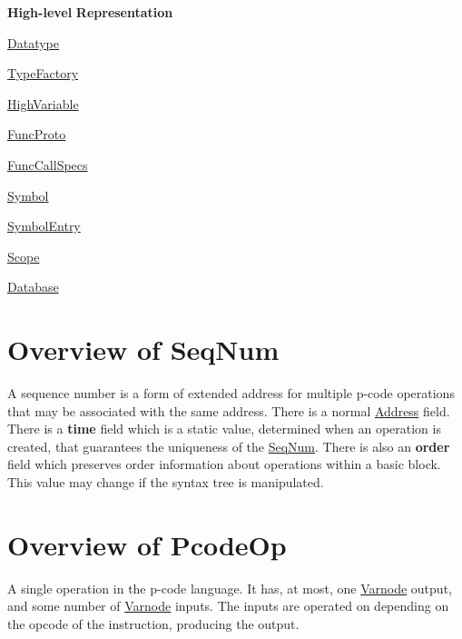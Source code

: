 {\bfseries{High-\/level}} {\bfseries{Representation}} 
\begin{DoxyItemize}
\item \mbox{\hyperlink{coreclasses_classdatatype}{Datatype}}
\item \mbox{\hyperlink{coreclasses_classtypefactory}{Type\+Factory}}
\item \mbox{\hyperlink{coreclasses_classhighvariable}{High\+Variable}}
\item \mbox{\hyperlink{coreclasses_classfuncproto}{Func\+Proto}}
\item \mbox{\hyperlink{coreclasses_classcallspecs}{Func\+Call\+Specs}}
\item \mbox{\hyperlink{coreclasses_classsymbol}{Symbol}}
\item \mbox{\hyperlink{coreclasses_classsymbolentry}{Symbol\+Entry}}
\item \mbox{\hyperlink{coreclasses_classscope}{Scope}}
\item \mbox{\hyperlink{coreclasses_classdatabase}{Database}}
\end{DoxyItemize}\hypertarget{coreclasses_classseqnum}{}\section{Overview of Seq\+Num}\label{coreclasses_classseqnum}
A sequence number is a form of extended address for multiple p-\/code operations that may be associated with the same address. There is a normal \mbox{\hyperlink{class_address}{Address}} field. There is a {\bfseries{time}} field which is a static value, determined when an operation is created, that guarantees the uniqueness of the \mbox{\hyperlink{class_seq_num}{Seq\+Num}}. There is also an {\bfseries{order}} field which preserves order information about operations within a basic block. This value may change if the syntax tree is manipulated.


\begin{DoxyCode}{0}
\end{DoxyCode}
\hypertarget{coreclasses_classpcodeop}{}\section{Overview of Pcode\+Op}\label{coreclasses_classpcodeop}
A single operation in the p-\/code language. It has, at most, one \mbox{\hyperlink{class_varnode}{Varnode}} output, and some number of \mbox{\hyperlink{class_varnode}{Varnode}} inputs. The inputs are operated on depending on the opcode of the instruction, producing the output.


